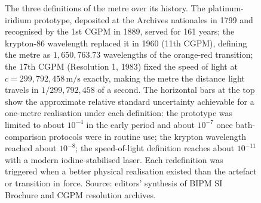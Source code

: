 \begin{figure}[ht]

\caption[Three definitions of the metre, 1799 to present]{The three
definitions of the metre over its history. The platinum-iridium
prototype, deposited at the Archives nationales in 1799 and
recognised by the 1st CGPM in 1889, served for 161 years; the
krypton-86 wavelength replaced it in 1960 (11th CGPM), defining
the metre as $1{,}650{,}763.73$ wavelengths of the orange-red
transition; the 17th CGPM (Resolution 1, 1983) fixed the speed of
light at $c = 299{,}792{,}458\,\si{\meter\per\second}$ exactly,
making the metre the distance light travels in $1/299{,}792{,}458$
of a second. The horizontal bars at the top show the approximate
relative standard uncertainty achievable for a one-metre
realisation under each definition: the prototype was limited to
about $10^{-4}$ in the early period and about $10^{-7}$ once
bath-comparison protocols were in routine use; the krypton
wavelength reached about $10^{-8}$; the speed-of-light definition
reaches about $10^{-11}$ with a modern iodine-stabilised laser.
Each redefinition was triggered when a better physical realisation
existed than the artefact or transition in force. Source: editors'
synthesis of BIPM SI Brochure \cite{std:bipm-si2019} and CGPM
resolution archives.}
\label{fig:vol01:ch07:metre-timeline}
\end{figure}
